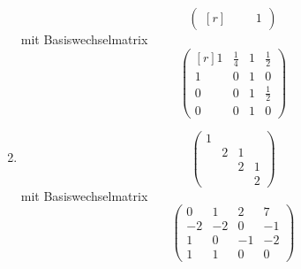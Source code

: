 \begin{solution}
\begin{enumerate}
\[\begin{pmatrix*}[r]
              &     &   & 1
        \end{pmatrix*}
      \]
      mit Basiswechselmatrix
      \[
        \begin{pmatrix*}[r]
          1 & \frac{1}{4} & 1 & \frac{1}{2} \\
          1 & 0           & 1 & 0           \\
          0 & 0           & 1 & \frac{1}{2} \\
          0 & 0           & 1 & 0
        \end{pmatrix*}
      \]
    \item
      \[
        \begin{pmatrix}
          1 &   &   &   \\
            & 2 & 1 &   \\
            &   & 2 & 1 \\
            &   &   & 2
        \end{pmatrix}
      \]
      mit Basiswechselmatrix
      \[
        \begin{pmatrix}
           0  &  1  &  2  &  7  \\
          -2  & -2  &  0  & -1  \\
           1  &  0  & -1  & -2  \\
           1  &  1  &  0  &  0
        \end{pmatrix}
      \]
  \end{enumerate}
\end{solution}


